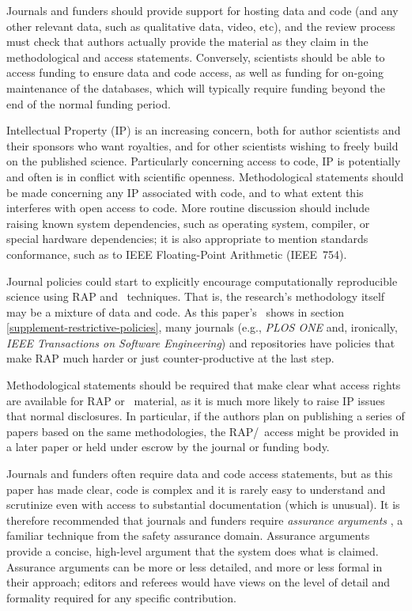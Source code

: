 \documentclass{comjnl}
\begin{document}
Journals and funders should provide support for hosting data and code (and any other relevant data, such as qualitative data, video, etc), and the review process must check that authors actually provide the material as they claim in the methodological and access statements. Conversely, scientists should be able to access funding to ensure data and code access, as well as funding for on-going maintenance of the databases, which will typically require funding beyond the end of the normal funding period.

Intellectual Property (IP) is an increasing concern, both for author scientists and their sponsors who want royalties, and for other scientists wishing to freely build on the published science. Particularly concerning access to code, IP is potentially and often is in conflict with scientific openness. Methodological statements should be made concerning any IP associated with code, and to what extent this interferes with open access to code. More routine discussion should include raising known system dependencies, such as operating system, compiler, or special hardware dependencies; it is also appropriate to mention standards conformance, such as to IEEE Floating-Point Arithmetic (IEEE~754).

\label{mentionPLOSandIEEE}
Journal policies could start to explicitly encourage computationally reproducible science using RAP and \RAPstar\ techniques. That is, the research's methodology itself may be a mixture of data and code. As this paper's \supplement\ shows in section \ref{supplement-restrictive-policies}, many journals (e.g., \emph{PLOS ONE\/} and, ironically, \emph{IEEE Transactions on Software Engineering\/}) and repositories have policies that make RAP much harder or just counter-productive at the last step. 

Methodological statements should be required that make clear what access rights are available for RAP or \RAPstar\ material, as it is much more likely to raise IP issues that normal disclosures. In particular, if the authors plan on publishing a series of papers based on the same methodologies, the RAP/\RAPstar\ access might be provided in a later paper or held under escrow by the journal or funding body.

Journals and funders often require data and code access statements, but as this paper has made clear, code is complex and it is rarely easy to understand and scrutinize even with access to substantial documentation (which is unusual). It is therefore recommended that journals and funders require \emph{assurance arguments} \cite{assurance-case}, a familiar technique from the safety assurance domain. Assurance arguments provide a concise, high-level argument that the system does what is claimed. Assurance arguments can be more or less detailed, and more or less formal in their approach; editors and referees would have views on the level of detail and formality required for any specific contribution.
\end{document}
